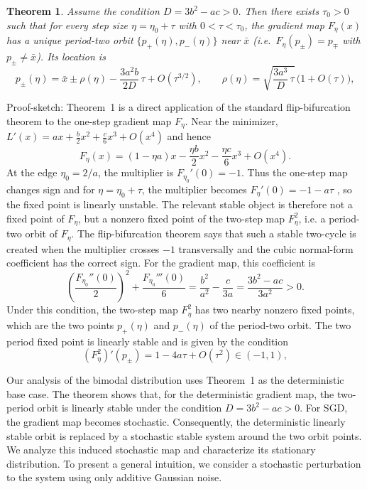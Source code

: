 \documentclass{article} %
\theoremstyle{plain}
\newtheorem{theorem}{Theorem}
\theoremstyle{definition}
\newcommand{\Fmap}{F}
\newcommand{\xbar}{\bar{x}}
\begin{document}
\begin{theorem}\label{thm:A}
Assume the condition $D=3b^2-ac>0$. Then there exists
$\tau_0>0$ such that for every step size $\eta=\eta_0+\tau$ with
$0<\tau<\tau_0$, the gradient map $F_\eta(x)$ has a unique period-two orbit
$\{p_+(\eta),p_-(\eta)\}$ near $\xbar$ (i.e.\ $\Fmap_\eta(p_\pm)=p_\mp$ with
$p_\pm\neq\xbar$). Its location is
\begin{equation}\label{eq:amp}
  p_\pm(\eta)=\xbar\pm\rho(\eta)-\frac{3a^{2}b}{2D}\,\tau+O(\tau^{3/2}),
  \qquad
  \rho(\eta)=\sqrt{\frac{3a^{3}}{D}\,\tau}\,\bigl(1+O(\tau)\bigr),
 \end{equation}
\end{theorem}
Proof-sketch: Theorem~1 is a direct application of the standard flip-bifurcation theorem to
the one-step gradient map \(F_\eta\).  Near the minimizer, $  L'(x)=ax+\frac b2 x^2+\frac c6 x^3+O(x^4)$
and hence
\[
    F_\eta(x)
    =
    (1-\eta a)x-\frac{\eta b}{2}x^2-\frac{\eta c}{6}x^3+O(x^4).
\]
At the edge \(\eta_0=2/a\), the multiplier is $  F_{\eta_0}'(0)=-1$. 
Thus the one-step map changes sign and for
\(\eta=\eta_0+\tau\), the multiplier becomes $F_\eta'(0)=-1-a\tau$
, so the fixed point is linearly unstable.  The relevant stable object is
therefore not a fixed point of \(F_\eta\), but a nonzero fixed point of the
two-step map \(F_\eta^2\), i.e. a period-two orbit of \(F_\eta\). The flip-bifurcation theorem says that such a stable two-cycle is created when
the multiplier crosses \(-1\) transversally and the cubic normal-form
coefficient has the correct sign.  For the gradient map, this coefficient is
\[
    \left(\frac{F_{\eta_0}''(0)}{2}\right)^2
    +
    \frac{F_{\eta_0}'''(0)}{6}
    =
    \frac{b^2}{a^2}-\frac{c}{3a}
    =
    \frac{3b^2-ac}{3a^2} >0.
\]
Under this condition, the two-step map \(F_\eta^2\) has two nearby nonzero fixed
points, which are the two points \(p_+(\eta)\) and \(p_-(\eta)\) of the
period-two orbit. The two period fixed point is linearly stable and is given by the condition  
\[
    (F_\eta^2)'(p_\pm)
    =
    1-4a\tau+O(\tau^2)\in(-1,1),
\]

Our analysis of the bimodal distribution uses Theorem~1 as the deterministic
base case. The theorem shows that, for the deterministic gradient map, the
two-period orbit is linearly stable under the condition \(D=3b^2-ac>0\). For
SGD, the gradient map becomes stochastic. Consequently, the deterministic
linearly stable orbit is replaced by a stochastic stable system around the two
orbit points. We analyze this induced stochastic map and characterize its
stationary distribution. To present a general intuition, we consider a stochastic perturbation to the system using only additive Gaussian noise. 
\end{document}
